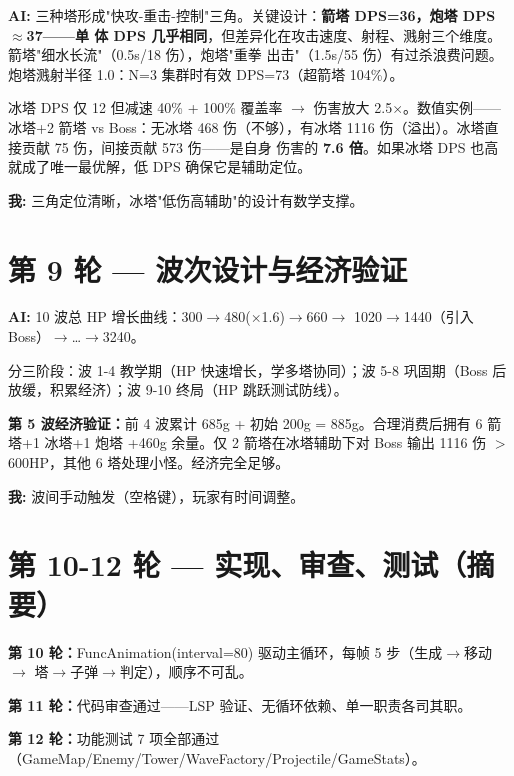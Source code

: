 \documentclass[12pt,a4paper]{ctexart}
\begin{document}
\textbf{AI:} 三种塔形成"快攻-重击-控制"三角。关键设计：\textbf{箭塔 DPS=36，炮塔 DPS$\approx$37——单
体 DPS 几乎相同}，但差异化在攻击速度、射程、溅射三个维度。箭塔"细水长流"（0.5s/18 伤），炮塔"重拳
出击"（1.5s/55 伤）有过杀浪费问题。炮塔溅射半径 1.0：N=3 集群时有效 DPS=73（超箭塔 104\%）。

冰塔 DPS 仅 12 但减速 40\% + 100\% 覆盖率 $\rightarrow$ 伤害放大 2.5$\times$。数值实例——冰塔+2 箭塔
vs Boss：无冰塔 468 伤（不够），有冰塔 1116 伤（溢出）。冰塔直接贡献 75 伤，间接贡献 573 伤——是自身
伤害的 \textbf{7.6 倍}。如果冰塔 DPS 也高就成了唯一最优解，低 DPS 确保它是辅助定位。

\textbf{我:} 三角定位清晰，冰塔"低伤高辅助"的设计有数学支撑。

\section*{第 9 轮 — 波次设计与经济验证}

\textbf{AI:} 10 波总 HP 增长曲线：300$\rightarrow$480($\times$1.6)$\rightarrow$660$\rightarrow$
1020$\rightarrow$1440（引入 Boss）$\rightarrow$…$\rightarrow$3240。

分三阶段：波 1-4 教学期（HP 快速增长，学多塔协同）；波 5-8 巩固期（Boss 后放缓，积累经济）；波 9-10
终局（HP 跳跃测试防线）。

\textbf{第 5 波经济验证：}前 4 波累计 685g + 初始 200g = 885g。合理消费后拥有 6 箭塔+1 冰塔+1 炮塔
+460g 余量。仅 2 箭塔在冰塔辅助下对 Boss 输出 1116 伤 $>$ 600HP，其他 6 塔处理小怪。经济完全足够。

\textbf{我:} 波间手动触发（空格键），玩家有时间调整。

\section*{第 10-12 轮 — 实现、审查、测试（摘要）}

\textbf{第 10 轮：}FuncAnimation(interval=80) 驱动主循环，每帧 5 步（生成$\rightarrow$移动$\rightarrow$
塔$\rightarrow$子弹$\rightarrow$判定），顺序不可乱。

\textbf{第 11 轮：}代码审查通过——LSP 验证、无循环依赖、单一职责各司其职。

\textbf{第 12 轮：}功能测试 7 项全部通过（GameMap/Enemy/Tower/WaveFactory/Projectile/GameStats）。

\end{document}
